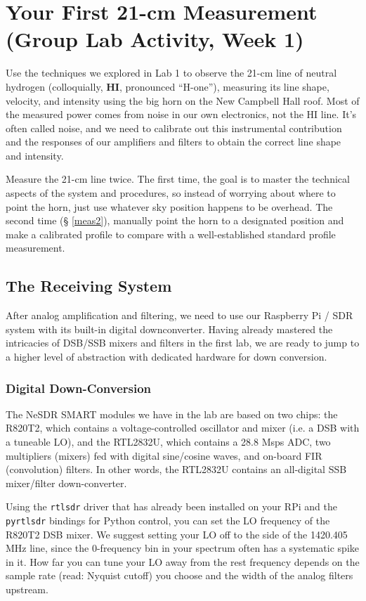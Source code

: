 \documentclass[11pt,preprint]{aastex}
\begin{document}
\section{Your First 21-cm Measurement (Group Lab Activity, Week 1)}
\label{radioastro}

\noindent
Use the techniques we explored in Lab 1 to observe the
21-cm line of neutral hydrogen (colloquially, {\bf
  HI}, pronounced ``H-one''), measuring its line
shape, velocity, and intensity using the big horn on the New Campbell Hall roof.
Most of the measured power comes from noise in our own electronics, not the HI
line.  It's often called noise, and we need to calibrate out this
instrumental contribution and the responses of our amplifiers and filters to
obtain the correct line shape and intensity.

Measure the 21-cm line twice. The first time, the goal is to master
the technical aspects of the system and
procedures, so instead of worrying about where to point the horn,
just use whatever sky position happens to be overhead. The second time (\S
\ref{meas2}), manually point the horn to a designated position and
make a calibrated profile to compare with a well-established standard
profile measurement.

\subsection{The Receiving System}

\noindent
After analog amplification and filtering, we need to use our
Raspberry Pi / SDR system with its built-in digital downconverter.
Having already mastered the intricacies of DSB/SSB mixers and filters in the
first lab, we are ready to jump to a higher level of 
abstraction with dedicated hardware for down conversion.

\subsubsection{Digital Down-Conversion}

\noindent
The NeSDR SMART modules we have in the lab are based on two chips:
the R820T2, which contains a voltage-controlled oscillator and mixer
(i.e. a DSB with a tuneable LO), and the RTL2832U, which contains
a 28.8 Msps ADC, two multipliers (mixers) fed with digital sine/cosine
waves, and on-board FIR (convolution) filters. 
In other words, the RTL2832U contains an all-digital SSB mixer/filter
down-converter.

Using the {\tt rtlsdr} driver that has already been installed on your
RPi and the {\tt pyrtlsdr} bindings for Python control, you can set
the LO frequency of the R820T2 DSB mixer.
We suggest setting your LO off to the side of the 1420.405 MHz line,
since the 0-frequency bin in your spectrum often has a
systematic spike in it. How far you can tune your LO away from the
rest frequency depends on the sample rate (read: Nyquist cutoff) you
choose and the width of the analog filters upstream.
\end{document}
